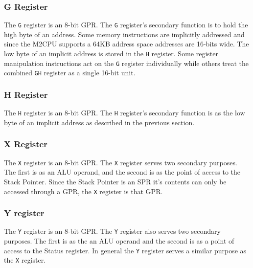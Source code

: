 \documentclass[a4paper,12pt]{article}
\newcommand{\mt}{M2CPU}
\newcommand{\Gr}{\texttt{G}}
\newcommand{\Hr}{\texttt{H}}
\newcommand{\Xr}{\texttt{X}}
\newcommand{\Yr}{\texttt{Y}}
\begin{document}
\subsubsection{G Register}
The \Gr{} register is an 8-bit GPR. The \Gr{} register's secondary function is to hold 
the high byte of an address. Some memory instructions are implicitly addressed 
and since the \mt{} supports a 64KB address space addresses are 16-bits wide.
The low byte of an implicit address is stored in the \Hr{} register. Some 
register manipulation instructions act on the \Gr{} register individually while others
treat the combined \Gr{}\Hr{} register as a single 16-bit unit.
\par

\subsubsection{H Register}
The \Hr{} register is an 8-bit GPR. The \Hr{} register's secondary function is as the 
low byte of an implicit address as described in the previous section.
\par

\subsubsection{X Register}
The \Xr{} register is an 8-bit GPR. The \Xr{} register serves two secondary
purposes. The first is as an ALU operand, and the second is as the point of 
access to the Stack Pointer. Since the Stack Pointer is an SPR it's contents
can only be accessed through a GPR, the \Xr{} register is that GPR.
\par

\subsubsection{Y register}
The \Yr{} register is an 8-bit GPR. The \Yr{} register also serves two 
secondary purposes. The first is as the an ALU operand and the second is as
a point of access to the Status register. In general the \Yr{} register serves
a similar purpose as the \Xr{} register.
\par
\end{document}
